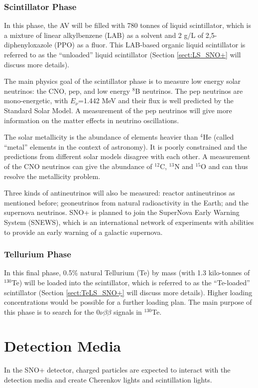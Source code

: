 \subsubsection{Scintillator Phase}

In this phase, the AV will be filled with 780 tonnes of liquid scintillator, which is a mixture of linear alkylbenzene (LAB) as a solvent and 2 g/L of 2,5-diphenyloxazole (PPO) as a fluor. This LAB-based organic liquid scintillator is referred to as the ``unloaded'' liquid scintillator (Section \ref{sect:LS_SNO+} will discuss more details).

The main physics goal of the scintillator phase is to measure low energy solar neutrinos: the CNO, pep, and low energy $^8$B neutrinos. The pep neutrinos are mono-energetic, with $E_\nu$=1.442 MeV and their flux is well predicted by the Standard Solar Model\cite{davini2016cno}. A measurement of the pep neutrinos will give more information on the matter effects in neutrino oscillations. 

The solar metallicity is the abundance of elements heavier than $^4$He (called ``metal'' elements in the context of astronomy). It is poorly constrained and the predictions from different solar models disagree with each other. A measurement of the CNO neutrinos can give the abundance of $^{12}$C, $^{13}$N and $^{15}$O and can thus resolve the metallicity problem\cite{cerdeno2018cno}.

Three kinds of antineutrinos will also be measured: reactor antineutrinos as mentioned before; geoneutrinos from natural radioactivity in the Earth; and the supernova neutrinos. SNO+ is planned to join the SuperNova Early Warning System (SNEWS), which is an international network of experiments with abilities to provide an early warning of a galactic supernova\cite{snop_jinst}.

\subsubsection{Tellurium Phase}
In this final phase, 0.5\% natural Tellurium (Te) by mass (with 1.3 kilo-tonnes of $^{130}$Te) will be loaded into the scintillator, which is referred to as the ``Te-loaded'' scintillator (Section \ref{sect:TeLS_SNO+} will discuss more details). Higher loading concentrations would be possible for a further loading plan\cite{Paton:2019kgy}. The main purpose of this phase is to search for the $0\nu\beta\beta$ signals in $^{130}$Te.

\section{Detection Media}
In the SNO+ detector, charged particles are expected to interact with the detection media and create Cherenkov lights and scintillation lights. 

